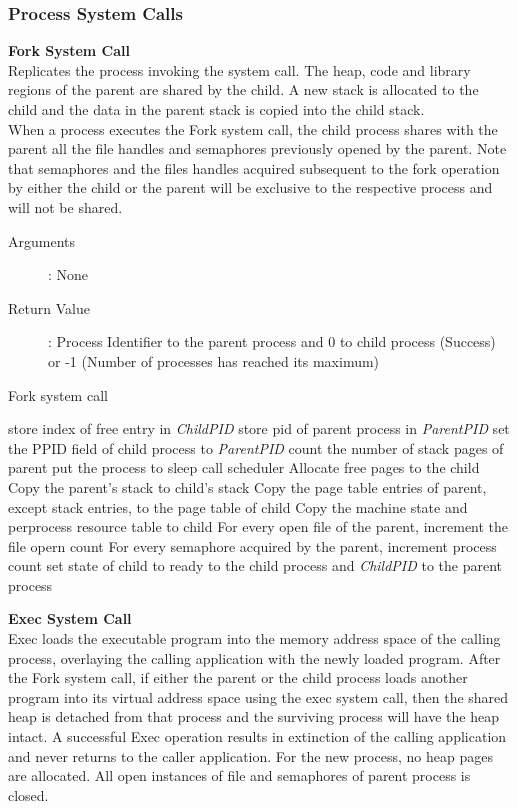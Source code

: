 \documentclass[10pt]{article}
\begin{document}
\subsubsection{Process System Calls}
\textbf{Fork System Call}\\
Replicates the process invoking the system call. The heap, code and library regions of the parent are shared by the child. A new stack is allocated to the child and the data in the parent stack is copied into the child stack.
\\
When a process executes the Fork system call, the child process shares with the parent all the file handles and semaphores previously opened by the parent. Note that semaphores and the files handles acquired subsequent to the fork operation by either the child or the parent will be exclusive to the respective process and will not be shared.
\begin{description}
\item[Arguments]: None
\item[Return Value]: Process Identifier to the parent process and 0 to child process (Success) or -1 (Number of processes has reached its maximum)
\end{description} 
\begin{algorithm}
\caption{Fork system call}
\begin{algorithmic}
\ELSE
    \STATE store index of free entry in \textit{ChildPID}
    \STATE store pid of parent process in \textit{ParentPID}
\ENDIF
\STATE set the PPID field of child process to \textit{ParentPID}
\STATE count the number of stack pages of parent
    \STATE put the process to sleep
    \STATE call scheduler
\ENDWHILE
\STATE Allocate free pages to the child
\STATE Copy the parent's stack to child's stack
\STATE Copy the page table entries of parent, except stack entries, to the page table of child
\STATE Copy the machine state and per\-process resource table to child
\STATE For every open file of the parent, increment the file opern count
\STATE For every semaphore acquired by the parent, increment process count
\STATE set state of child to ready
 to the child process and \textit{ChildPID} to the parent process
\end{algorithmic}
\end{algorithm}
\textbf{Exec System Call}\\
Exec loads the executable program into the memory address space of the calling process, overlaying the calling application with the newly loaded program. After the Fork system call, if either the parent or the child process loads another program into its virtual address space using the exec system call, then the shared heap is detached from that process and the surviving process will have the heap intact. A successful Exec operation results in extinction of the calling application and never returns to the caller application. For the new process, no heap pages are allocated. All open instances of file and semaphores of parent process is closed. 
\end{document}
